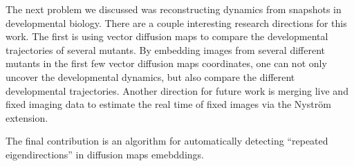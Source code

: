 The next problem we discussed was reconstructing dynamics from snapshots in developmental biology. 
%
There are a couple interesting research directions for this work. 
%
The first is using vector diffusion maps to compare the developmental trajectories of several mutants. 
%
By embedding images from several different mutants in the first few vector diffusion maps coordinates, one can not only uncover the developmental dynamics, but also compare the different developmental trajectories. 
%
Another direction for future work is merging live and fixed imaging data to estimate the real time of fixed images via the Nystr\"{o}m extension. 

The final contribution is an algorithm for automatically detecting ``repeated eigendirections'' in diffusion maps emebddings. 
%

